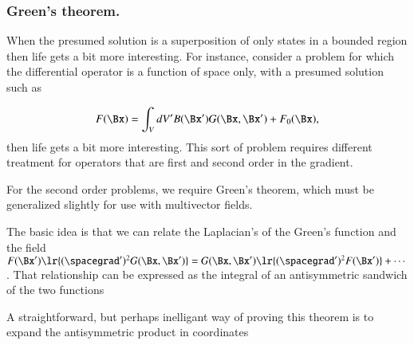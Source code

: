 \subsubsection{Green's theorem.}

When the presumed solution is a superposition of only states in a bounded region
then life gets a bit more interesting.  For instance, consider a problem for which the differential operator is a function of space only, with a presumed solution such as

\begin{dmath}\label{eqn:greensFunctionSolutions:200}
F(\Bx) = \int_V dV' B(\Bx') G(\Bx, \Bx') + F_0(\Bx),
\end{dmath}
then life gets a bit more interesting.
This sort of problem requires different treatment for operators that are first and second order in the gradient.

For the second order problems, we require Green's theorem, which must be generalized slightly for use with multivector fields.

The basic idea is that we can relate the Laplacian's of the Green's function and the field
\( F(\Bx') \lr{ (\spacegrad')^2 G(\Bx, \Bx') } = G(\Bx, \Bx') \lr{ (\spacegrad')^2 F(\Bx')} + \cdots \).
That relationship can be expressed as the integral of an antisymmetric sandwich of the two functions


A straightforward, but perhaps inelligant way of proving this theorem is to expand the antisymmetric product in coordinates

